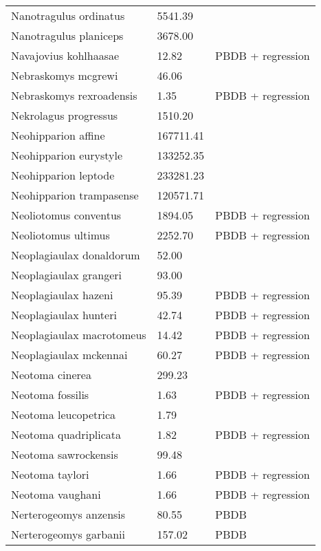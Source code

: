 \documentclass{article}
\begin{document}
\begin{center}
\begin{longtable}{p{} p{} p{}}
    Nanotragulus ordinatus & 5541.39 & \cite{Tomiya2013} \\ 
    Nanotragulus planiceps & 3678.00 & \cite{McKenna2011} \\ 
    Navajovius kohlhaasae & 12.82 & PBDB + regression \\ 
    Nebraskomys mcgrewi & 46.06 & \cite{Tomiya2013} \\ 
    Nebraskomys rexroadensis & 1.35 & PBDB + regression \\ 
    Nekrolagus progressus & 1510.20 & \cite{Tomiya2013} \\ 
    Neohipparion affine & 167711.41 & \cite{Tomiya2013} \\ 
    Neohipparion eurystyle & 133252.35 & \cite{Tomiya2013} \\ 
    Neohipparion leptode & 233281.23 & \cite{Tomiya2013} \\ 
    Neohipparion trampasense & 120571.71 & \cite{Tomiya2013} \\ 
    Neoliotomus conventus & 1894.05 & PBDB + regression \\ 
    Neoliotomus ultimus & 2252.70 & PBDB + regression \\ 
    Neoplagiaulax donaldorum & 52.00 & \cite{Wilson2012} \\ 
    Neoplagiaulax grangeri & 93.00 & \cite{Wilson2012} \\ 
    Neoplagiaulax hazeni & 95.39 & PBDB + regression \\ 
    Neoplagiaulax hunteri & 42.74 & PBDB + regression \\ 
    Neoplagiaulax macrotomeus & 14.42 & PBDB + regression \\ 
    Neoplagiaulax mckennai & 60.27 & PBDB + regression \\ 
    Neotoma cinerea & 299.23 & \cite{Smith2004} \\ 
    Neotoma fossilis & 1.63 & PBDB + regression \\ 
    Neotoma leucopetrica & 1.79 & \cite{Grohe2010} \\ 
    Neotoma quadriplicata & 1.82 & PBDB + regression \\ 
    Neotoma sawrockensis & 99.48 & \cite{Tomiya2013} \\ 
    Neotoma taylori & 1.66 & PBDB + regression \\ 
    Neotoma vaughani & 1.66 & PBDB + regression \\ 
    Nerterogeomys anzensis & 80.55 & PBDB \\ 
    Nerterogeomys garbanii & 157.02 & PBDB \\ 

\end{longtable}
\end{center}
\end{document}
